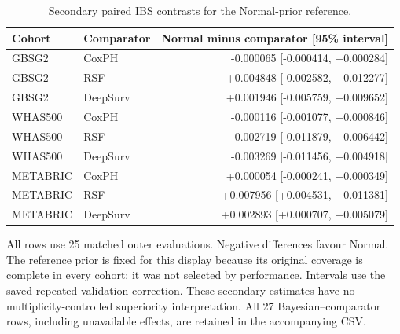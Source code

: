 \begin{table}[htbp]
\centering
\small
\caption{Secondary paired IBS contrasts for the Normal-prior reference.}
\label{tab:report-secondary}
\begin{tabular}{@{}llr@{}}
\toprule
Cohort & Comparator & Normal minus comparator [95\% interval]\\
\midrule
GBSG2 & CoxPH & -0.000065 [-0.000414, +0.000284]\\
GBSG2 & RSF & +0.004848 [-0.002582, +0.012277]\\
GBSG2 & DeepSurv & +0.001946 [-0.005759, +0.009652]\\
WHAS500 & CoxPH & -0.000116 [-0.001077, +0.000846]\\
WHAS500 & RSF & -0.002719 [-0.011879, +0.006442]\\
WHAS500 & DeepSurv & -0.003269 [-0.011456, +0.004918]\\
METABRIC & CoxPH & +0.000054 [-0.000241, +0.000349]\\
METABRIC & RSF & +0.007956 [+0.004531, +0.011381]\\
METABRIC & DeepSurv & +0.002893 [+0.000707, +0.005079]\\
\bottomrule
\end{tabular}
\par\smallskip
\begin{minipage}{\textwidth}\footnotesize All rows use 25 matched outer evaluations. Negative differences favour Normal. The reference prior is fixed for this display because its original coverage is complete in every cohort; it was not selected by performance. Intervals use the saved repeated-validation correction. These secondary estimates have no multiplicity-controlled superiority interpretation. All 27 Bayesian--comparator rows, including unavailable effects, are retained in the accompanying CSV.\end{minipage}
\end{table}
